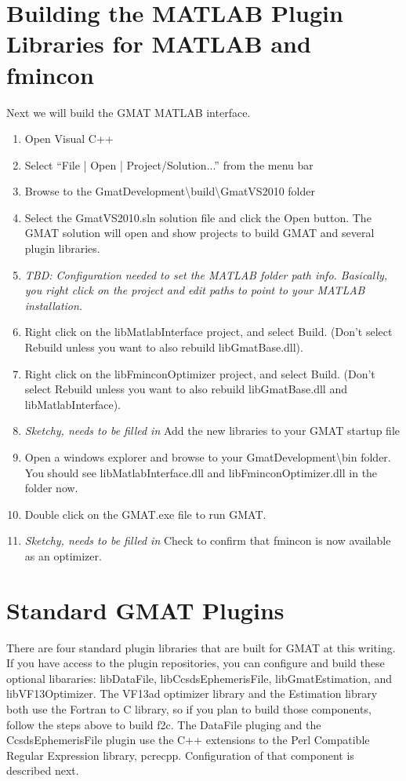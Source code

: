 \documentclass[letterpaper,10pt]{article}%
\begin{document}
\section{Building the MATLAB Plugin Libraries for MATLAB and fmincon}

Next we will build the GMAT MATLAB interface.

\begin{enumerate}
\item Open Visual C++
\item Select ``File | Open | Project/Solution...'' from the menu bar
\item Browse to the GmatDevelopment\textbackslash build\textbackslash GmatVS2010 folder
\item Select the GmatVS2010.sln solution file and click the Open button.  The GMAT solution will open and show projects to build GMAT and several plugin libraries.
\item \textit{TBD: Configuration needed to set the MATLAB folder path info.  Basically, you right click on the project and edit paths to point to your MATLAB installation.}
\item Right click on the libMatlabInterface project, and select Build.  (Don't select Rebuild unless you want to also rebuild libGmatBase.dll).
\item Right click on the libFminconOptimizer project, and select Build.  (Don't select Rebuild unless you want to also rebuild libGmatBase.dll and libMatlabInterface).
\item \textit{Sketchy, needs to be filled in} Add the new libraries to your GMAT startup file
\item Open a windows explorer and browse to your GmatDevelopment\textbackslash bin folder.  You should see libMatlabInterface.dll and libFminconOptimizer.dll in the folder now.
\item Double click on the GMAT.exe file to run GMAT.
\item \textit{Sketchy, needs to be filled in} Check to confirm that fmincon is now available as an optimizer.
\end{enumerate}


\section{Standard GMAT Plugins}

There are four standard plugin libraries that are built for GMAT at this writing.  If you have access to the plugin repositories, you can configure and build these optional libararies: libDataFile, libCcsdsEphemerisFile, libGmatEstimation, and libVF13Optimizer.  The VF13ad optimizer library and the Estimation library both use the Fortran to C library, so if you plan to build those components, follow the steps above to build f2c.  The DataFile pluging and the CcsdsEphemerisFile plugin use the C++ extensions to the Perl Compatible Regular Expression library, pcrecpp.  Configuration of that component is described next.
\end{document}
